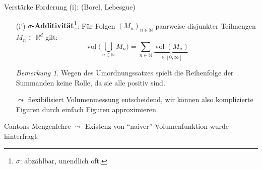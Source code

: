 \documentclass[12pt,a4paper]{article}
\theoremstyle{definition}
\theoremstyle{remark}
\newtheorem*{remark}{Bemerkung}
\newcommand{\R}{\mathbb{R}}
\newcommand{\N}{\mathbb{N}}
\newcommand{\vol}{\operatorname{vol}}
\begin{document}
Verstärke Forderung (i): (Borel, Lebesgue)
\begin{enumerate}
\item[(i')]\textbf{$\sigma$-Additivität\footnote{$\sigma$: abzählbar, unendlich oft.}}: Für Folgen $(M_n)_{n\in \N}$ paarweise disjunkter Teilmengen $M_n \subset \R^d$ gilt:
\begin{equation}
\vol\bigg( \bigcup_{n\in \N} M_n \bigg) = \sum_{n\in \N} \underbrace{\vol (M_n)}_{\in [0,\infty]} 
\end{equation}
\begin{remark}
Wegen des Umordnungssatzes spielt die Reihenfolge der Summanden keine Rolle, da sie alle positiv sind.
\end{remark}
$\leadsto$ flexibilisiert Volumenmessung entscheidend, wir können also komplizierte Figuren durch einfach Figuren approximieren.
\end{enumerate}
Cantons Mengenlehre $\leadsto$ Existenz von ``naiver'' Volumenfunktion wurde hinterfragt: %
\end{document}
